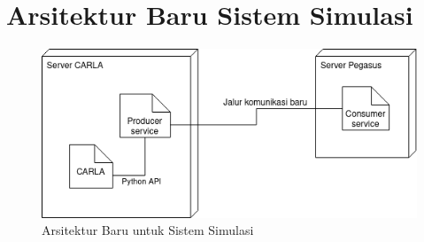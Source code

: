 \chapter{Arsitektur Baru Sistem Simulasi}\label{appendix-arsitektur-baru}
\begin{figure}[ht]
	\begin{center}
		\includegraphics[width=1.0\textwidth]{resources/appendix-1-deployment diagram.png}
		\caption{Arsitektur Baru untuk Sistem Simulasi}
	\end{center}
\end{figure}